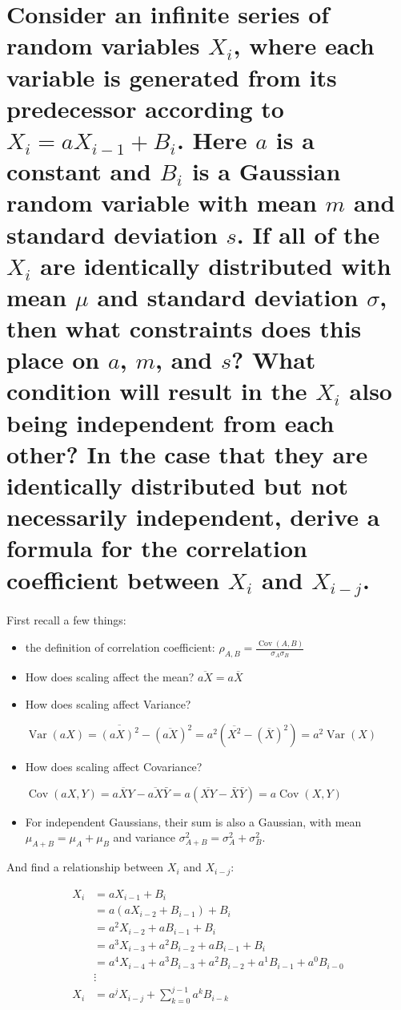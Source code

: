 \section{Consider an infinite series of random variables
\texorpdfstring{$X_i$}{Xi}, where each variable is generated from its
predecessor according to
\texorpdfstring{$X_i = aX_{i-1} + B_i$}{Xi = aXi-1 + Bi}.
Here \texorpdfstring{$a$}{a} is a constant and \texorpdfstring{$B_i$}{Bi}
is a Gaussian random variable with mean \texorpdfstring{$m$}{m}
and standard deviation \texorpdfstring{$s$}{s}.
If all of the \texorpdfstring{$X_i$}{Xi} are identically distributed
with mean \texorpdfstring{$\mu$}{mu} and standard deviation
\texorpdfstring{$\sigma$}{sigma}, then what constraints does this place on
\texorpdfstring{$a$}{a}, \texorpdfstring{$m$}{m}, and \texorpdfstring{$s$}{s}?
What condition will result in the \texorpdfstring{$X_i$}{Xi} also being
independent from each other? In the case that they are identically
distributed but not necessarily independent,
derive a formula for the correlation coefficient between
\texorpdfstring{$X_i$}{Xi} and \texorpdfstring{$X_{i-j}$}{Xi-j}.}

First recall a few things:
\begin{itemize}
    \item the definition of correlation coefficient: $\rho_{A,B} = \frac{\operatorname{Cov}(A,B)}{\sigma_A \sigma_B}$
    \item How does scaling affect the mean? $\overline{aX} = a\overline{X}$
    \item How does scaling affect Variance?
    
    $\operatorname{Var}(aX) = \overline{(aX)^2} - (\overline{aX})^2 = a^2\left(\overline{X^2} - (\overline{X})^2\right) = a^2\operatorname{Var}(X) $
    
    \item How does scaling affect Covariance?
    
    $\operatorname{Cov}(aX, Y) = \overline{aXY} - \overline{aX}\bar{Y} = a(\overline{XY} - \bar{X}\bar{Y}) = a\operatorname{Cov}(X,Y) $

    \item For independent Gaussians, their sum is also a Gaussian, with mean $\mu_{A + B} = \mu_A + \mu_B$ and variance $\sigma_{A+B}^2 =\sigma_A^2 + \sigma_B^2$. 
\end{itemize}

And find a relationship between $X_i$ and $X_{i-j}$:
    
\begin{align*}
    X_i &= aX_{i-1} + B_i \\
    &= a(aX_{i-2} + B_{i-1}) + B_i \\
    &= a^2X_{i-2} + aB_{i-1} + B_i \\
    &= a^3X_{i-3} + a^2B_{i-2} + aB_{i-1} + B_i \\
    &= a^4X_{i-4} + a^3B_{i-3} + a^2B_{i-2} + a^1B_{i-1} + a^0B_{i-0} \\
    & \vdots \\
    X_i &= a^jX_{i-j} + \sum_{k=0}^{j-1}a^kB_{i-k} \\
\end{align*}

